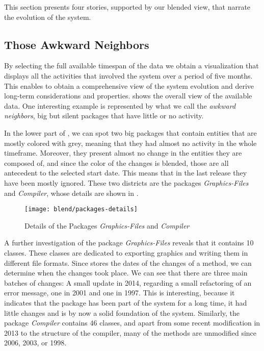 This section presents four stories, supported by our blended view, that narrate the evolution of the \pha system.


\subsection{Those Awkward Neighbors}

By selecting the full available timespan of the data we obtain a visualization that displays all the activities that involved the \pha system over a period of five months.
This enables to obtain a comprehensive view of the system evolution and derive long-term considerations and properties.
 shows the overall view of the available data.
One interesting example is represented by what we call the \emph{awkward neighbors}, \ie big but silent packages that have little or no activity.

In the lower part of , we can spot two big packages that contain entities that are mostly colored with grey, meaning that they had almost no activity in the whole timeframe.
Moreover, they present almost no change in the entities they are composed of, and since the color of the changes is blended, those are all antecedent to the selected start date.
This means that in the last release they have been mostly ignored.
These two districts are the packages \textit{Graphics-Files} and \textit{Compiler}, whose details are shown in .

\begin{figure}[ht]
\centering
\texttt{[image: blend/packages-details]}
\caption{Details of the Packages \textit{Graphics-Files} and \textit{Compiler}}
\label{fig:packages-details}
\end{figure}

A further investigation of the package \textit{Graphics-Files} reveals that it contains 10 classes.
These classes are dedicated to exporting graphics and writing them in different file formats.
Since \pha stores the dates of the changes of a method, we can determine when the changes took place.
We can see that there are three main batches of changes: A small update in 2014, regarding a small refactoring of an error message, one in 2001 and one in 1997.
This is interesting, because it indicates that the package has been part of the system for a long time, it had little changes and is by now a solid foundation of the system.
Similarly, the package \textit{Compiler} contains 46 classes, and apart from some recent modification in 2013 to the structure of the compiler, many of the methods are unmodified since 2006, 2003, or 1998.

